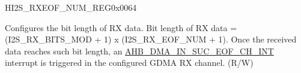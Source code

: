 \begin{register}{H}{I2S\_RXEOF\_NUM\_REG}{0x0064}\label{regdesc:I2SRXEOFNUMREG}
%
%
\regnewline%
\begin{regdesc}\begin{reglist}
\label{fielddesc:I2SRXEOFNUM}\item [I2S\_RX\_EOF\_NUM] Configures the bit length of RX data. Bit length of RX data = (I2S\_RX\_BITS\_MOD + 1) x (I2S\_RX\_EOF\_NUM + 1). Once the received data reaches such bit length, an \hyperref[int:GDMAINSUCEOFINT]{AHB\_DMA\_IN\_SUC\_EOF\_CH\_INT} interrupt is triggered in the configured GDMA RX channel. (R/W)
\end{reglist}\end{regdesc}
\end{register}



